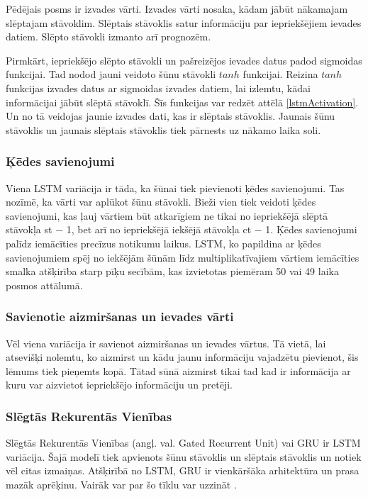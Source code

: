 \documentclass[12pt,paper=A4]{report}
\begin{document}
Pēdējais posms ir izvades vārti. Izvades vārti nosaka, kādam jābūt nākamajam slēptajam stāvoklim. Slēptais stāvoklis satur informāciju par iepriekšējiem ievades datiem. Slēpto stāvokli izmanto arī prognozēm. 

Pirmkārt, iepriekšējo slēpto stāvokli un pašreizējos ievades datus padod sigmoidas funkcijai. Tad nodod jauni veidoto šūnu stāvokli $tanh$ funkcijai. Reizina $tanh$ funkcijas izvades datus ar sigmoidas izvades datiem, lai izlemtu, kādai informācijai jābūt slēptā stāvoklī. Šīs funkcijas var redzēt attēlā \ref{lstmActivation}. Un no tā veidojas jaunie izvades dati, kas ir slēptais stāvoklis. Jaunais šūnu stāvoklis un jaunais slēptais stāvoklis tiek pārnests uz nākamo laika soli. 

\subsubsection{Ķēdes savienojumi}
Viena LSTM variācija ir tāda, ka šūnai tiek pievienoti ķēdes savienojumi. Tas nozīmē, ka vārti var aplūkot šūnu stāvokli. Bieži vien tiek veidoti ķēdes savienojumi, kas ļauj vārtiem būt atkarīgiem ne tikai no iepriekšējā slēptā stāvokļa st − 1, bet arī no iepriekšējā iekšējā stāvokļa ct − 1.  Ķēdes savienojumi palīdz iemācīties precīzus notikumu laikus. LSTM, ko papildina ar ķēdes savienojumiem spēj no iekšējām šūnām līdz multiplikatīvajiem vārtiem iemācīties smalka atšķirība starp pīķu secībām, kas izvietotas piemēram 50 vai 49 laika posmos attālumā.

\subsubsection{Savienotie aizmiršanas un ievades vārti}
Vēl viena variācija ir savienot aizmiršanas un ievades vārtus.  Tā vietā, lai atsevišķi nolemtu, ko aizmirst un kādu jaunu informāciju vajadzētu pievienot, šis lēmums tiek pieņemts kopā. Tātad sūnā aizmirst tikai tad kad ir informācija ar kuru var aizvietot iepriekšējo informāciju un pretēji. %

\subsubsection{Slēgtās Rekurentās Vienības}
Slēgtās Rekurentās Vienības (angļ. val. Gated Recurrent Unit) vai GRU ir LSTM variācija. Šajā modelī tiek apvienots šūnu stāvoklis un slēptais stāvoklis un notiek vēl citas izmaiņas. Atšķirībā no LSTM, GRU ir vienkāršāka arhitektūra un prasa mazāk aprēķinu. Vairāk var par šo tīklu var uzzināt \cite{ANNTutorial}.
\end{document}
